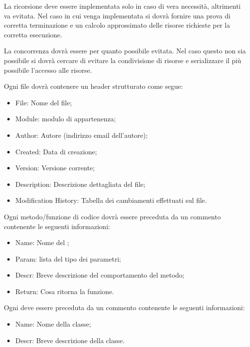 \label{}
La ricorsione deve essere implementata solo in caso di vera necessità, altrimenti va evitata. Nel caso in cui venga implementata si dovrà fornire una prova di corretta terminazione e un calcolo approssimato delle risorse richieste per la corretta esecuzione.

\label{}

La concorrenza dovrà essere per quanto possibile evitata. Nel caso questo non sia possibile si dovrà cercare di evitare la condivisione di risorse e serializzare il più possibile l'accesso alle risorse.

\label{5.3.1}
Ogni file dovrà contenere un header strutturato come segue:
\begin{itemize}
\item File: Nome del file;
\item Module: modulo di appartenenza;
\item Author: Autore (indirizzo email dell'autore);
\item Created: Data di creazione;
\item Version: Versione corrente;
\item Description: Descrizione dettagliata del file;
\item Modification History: Tabella dei cambiamenti effettuati sul file.
\end{itemize}

\label{5.3.2}
Ogni metodo/funzione di codice dovrà essere preceduta da un commento contenente le seguenti informazioni:
\begin{itemize}
\item Name: Nome del ;
\item Param: lista del tipo dei parametri;
\item Descr: Breve descrizione del comportamento del metodo;
\item Return: Cosa ritorna la funzione.
\end{itemize}

\label{5.3.3}
Ogni  deve essere preceduta da un commento contenente le seguenti informazioni:
\begin{itemize}
\item Name: Nome della classe;
\item Descr: Breve descrizione della classe.
\end{itemize}


